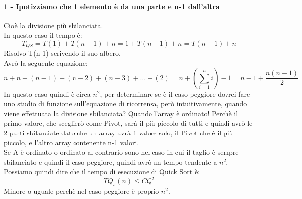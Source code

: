 \paragraph*{1 - Ipotizziamo che 1 elemento è da una parte e n-1 dall'altra} Cioè la divisione più sbilanciata.\\
In questo caso il tempo è:
\begin{equation*}
    T_{QS}=T(1)+T(n-1)+n = 1+T(n-1)+n = T(n-1)+n
\end{equation*}
Risolvo T(n-1) scrivendo il suo albero.\\
Avrò la seguente equazione:
\begin{equation*}
    n+n+(n-1)+(n-2)+(n-3)+\dots+(2)=n+(\sum_{i=1}^n i)-1=n-1+\frac{n(n-1)}{2}
\end{equation*}
In questo caso quindi è circa $n^2$, per determinare se è il caso peggiore dovrei
fare uno studio di funzione sull'equazione di ricorrenza, però intuitivamente, quando viene effettuata la divisione
sbilanciata? Quando l'array è ordinato! Perchè il primo valore, che sceglierò come Pivot, sarà il più piccolo di tutti e
quindi avrò le 2 parti sbilanciate dato che un array avrà 1 valore solo, il Pivot che è il più piccolo, e l'altro array 
contenente n-1 valori.\\
Se A è ordinato o ordinato al contrario sono nel caso in cui il taglio è sempre sbilanciato e quindi il caso peggiore, quindi
avrò un tempo tendente a $n^2$.\\
Possiamo quindi dire che il tempo di esecuzione di Quick Sort è:
\begin{equation*}
    TQ_s(n)\leq CQ^2
\end{equation*}
Minore o uguale perchè nel caso peggiore è proprio $n^2$.
